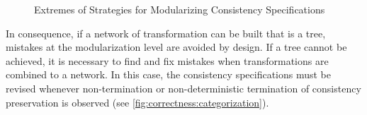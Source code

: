 \begin{figure}[tb]
    \centering
    
    \caption{Extremes of Strategies for Modularizing Consistency Specifications}
    \label{fig:correctness:modularization_strategies}
\end{figure}

In consequence, if a network of transformation can be built that is a tree, mistakes at the modularization level are avoided by design.
If a tree cannot be achieved, it is necessary to find and fix mistakes when transformations are combined to a network.
In this case, the consistency specifications must be revised whenever non-termination or non-deterministic termination of consistency preservation is observed (see \autoref{fig:correctness:categorization}). %



%     

